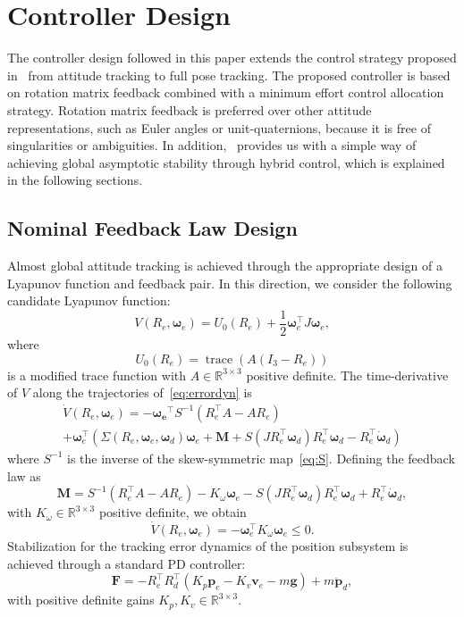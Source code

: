\documentclass[journal]{IEEEtran}
\newcommand{\tp}{^\top}
\newcommand{\eye}[1]{I_{#1}}
\DeclareMathOperator{\trace}{trace}
\begin{document}
\section{Controller Design}

The controller design followed in this paper extends the control strategy proposed in~\cite{mayhew_synergistic_2013} from attitude tracking to full pose tracking. The proposed controller is based on rotation matrix feedback combined with a minimum effort control allocation strategy. Rotation matrix feedback is preferred over other attitude representations, such as Euler angles or unit-quaternions, because it is free of singularities or ambiguities. In addition,~\cite{mayhew_synergistic_2013} provides us with a simple way of achieving global asymptotic stability through hybrid control, which is explained in the following sections.

\subsection{Nominal Feedback Law Design}
Almost global attitude tracking is achieved through the appropriate design of a Lyapunov function and feedback pair. In this direction, we consider the following candidate Lyapunov function:
\begin{equation*}
  V(R_e,\bm{\omega}_e) = U_0(R_e)+\frac{1}{2}\bm{\omega}_e\tp J\bm{\omega}_e,
\end{equation*}
where 
\begin{equation}\label{eq:U0}
  U_0(R_e) = \trace(A(\eye{3}-R_e))
\end{equation}
is a modified trace function with $A\in\mathbb{R}^{3\times3}$ positive definite. The time-derivative of $V$ along the trajectories of~\eqref{eq:errordyn} is
\begin{multline*}
  \dot{V}(R_e,\bm{\omega}_e) = -\bm{\omega_e}\tp S^{-1}(R_e\tp A - A R_e) \\
  +\bm{\omega}_e\tp(\Sigma(R_e,\bm{\omega}_e,\bm{\omega}_d)\bm{\omega}_e+\bm{M} + S(JR_e\tp\bm{\omega}_d)R_e\tp\bm{\omega}_d - R_e\tp\dot{\bm{\omega}}_d)
\end{multline*}
where $S^{-1}$ is the inverse of the skew-symmetric map~\eqref{eq:S}. Defining the feedback law as 
\begin{equation}\label{eq:attctrl}
  \bm{M} = S^{-1}(R_e\tp A - A R_e) - K_\omega \bm{\omega}_e - S(JR_e\tp\bm{\omega}_d)R_e\tp\bm{\omega}_d + R_e\tp\dot{\bm{\omega}}_d,
\end{equation}
with $K_\omega\in\mathbb{R}^{3\times3}$ positive definite, we obtain
\begin{equation*}
  \dot{V}(R_e,\bm{\omega}_e) = -\bm{\omega}_e\tp K_\omega \bm{\omega}_e \leq 0.
\end{equation*}
Stabilization for the tracking error dynamics of the position subsystem is achieved through a standard PD controller:
\begin{equation}\label{eq:Fctrl}
\bm{F} = -R_e\tp R_d\tp(K_p\bm{p}_e - K_v\bm{v}_e - m\bm{g})+m\ddot{\bm{p}}_d,
\end{equation}
with positive definite gains $K_p,K_v\in\mathbb{R}^{3\times 3}$.
\end{document}
